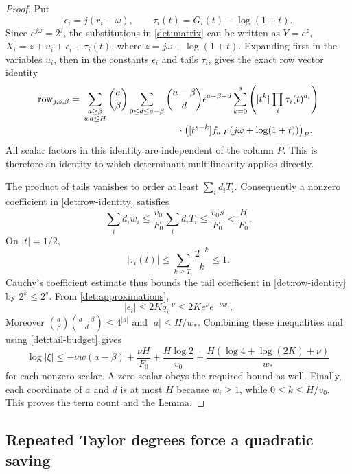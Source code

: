 \documentclass[11pt]{article}
\theoremstyle{definition}
\theoremstyle{remark}
\numberwithin{equation}{section}
\begin{document}
\begin{proof}
Put
\[
 \epsilon_i=j(r_i-\omega),\qquad
 \tau_i(t)=G_i(t)-\log(1+t).
\]
Since $e^{j\omega}=2^j$, the substitutions in \eqref{det:matrix} can be
written as $Y=e^z$, $X_i=z+u_i+\epsilon_i+\tau_i(t)$, where
$z=j\omega+\log(1+t)$.  Expanding first in the variables $u_i$, then
in the constants $\epsilon_i$ and tails $\tau_i$, gives the exact row
vector identity
\begin{align}
 \text{row}_{j,s,\beta}
 ={}&\sum_{\substack{a\ge\beta\\wa\le H}}
       \binom a\beta
       \sum_{0\le d\le a-\beta}\binom{a-\beta}{d}
       \epsilon^{a-\beta-d}
       \sum_{k=0}^s
       \left([t^k]\prod_i\tau_i(t)^{d_i}\right)
 \nonumber\\[-2pt]
 &\hspace{35mm}\cdot
 \bigl([t^{s-k}]f_{a,P}(j\omega+\log(1+t))\bigr)_P.
 \label{det:row-identity}
\end{align}
All scalar factors in this identity are independent of the column
$P$.  This is therefore an identity to which determinant
multilinearity applies directly.

The product of tails vanishes to order at least $\sum_i d_iT_i$.
Consequently a nonzero coefficient in \eqref{det:row-identity}
satisfies
\begin{equation}
 \sum_i d_iw_i\le\frac{v_0}{F_0}\sum_i d_iT_i
 \le\frac{v_0s}{F_0}<\frac{H}{F_0}.
 \label{det:tail-budget}
\end{equation}
On $|t|=1/2$,
\[
 |\tau_i(t)|
 \le\sum_{k\ge T_i}\frac{2^{-k}}k\le1.
\]
Cauchy's coefficient estimate thus bounds the tail coefficient in
\eqref{det:row-identity} by $2^k\le2^s$.  From
\eqref{det:approximations},
\[
 |\epsilon_i|\le2Kq_i^{-\nu}
 \le2K e^\nu e^{-\nu w_i}.
\]
Moreover
$\binom a\beta\binom{a-\beta}{d}\le4^{|a|}$ and
$|a|\le H/w_*$.  Combining these inequalities and using
\eqref{det:tail-budget} gives
\[
 \log|\xi|
 \le-\nu w(a-\beta)+\frac{\nu H}{F_0}
       +\frac{H\log2}{v_0}
       +\frac{H(\log4+\log(2K)+\nu)}{w_*}
\]
for each nonzero scalar.  A zero scalar obeys the required bound as
well.  Finally, each coordinate of $a$ and $d$ is at most $H$ because
$w_i\ge1$, while $0\le k\le H/v_0$.  This proves the term count and
the Lemma.
\end{proof}

\subsection{Repeated Taylor degrees force a quadratic saving}
\end{document}
